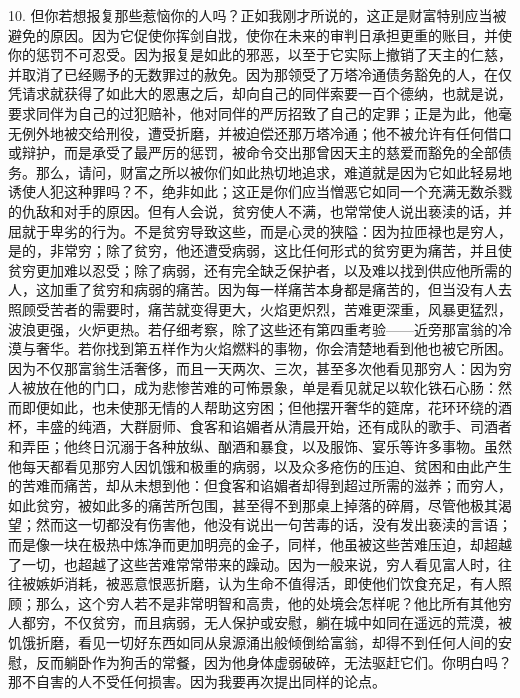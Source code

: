 10. 但你若想报复那些惹恼你的人吗？正如我刚才所说的，这正是财富特别应当被避免的原因。因为它促使你挥剑自戕，使你在未来的审判日承担更重的账目，并使你的惩罚不可忍受。因为报复是如此的邪恶，以至于它实际上撤销了天主的仁慈，并取消了已经赐予的无数罪过的赦免。因为那领受了万塔冷通债务豁免的人，在仅凭请求就获得了如此大的恩惠之后，却向自己的同伴索要一百个德纳，也就是说，要求同伴为自己的过犯赔补，他对同伴的严厉招致了自己的定罪；正是为此，他毫无例外地被交给刑役，遭受折磨，并被迫偿还那万塔冷通；他不被允许有任何借口或辩护，而是承受了最严厉的惩罚，被命令交出那曾因天主的慈爱而豁免的全部债务。那么，请问，财富之所以被你们如此热切地追求，难道就是因为它如此轻易地诱使人犯这种罪吗？不，绝非如此；这正是你们应当憎恶它如同一个充满无数杀戮的仇敌和对手的原因。但有人会说，贫穷使人不满，也常常使人说出亵渎的话，并屈就于卑劣的行为。不是贫穷导致这些，而是心灵的狭隘：因为拉匝禄也是穷人，是的，非常穷；除了贫穷，他还遭受病弱，这比任何形式的贫穷更为痛苦，并且使贫穷更加难以忍受；除了病弱，还有完全缺乏保护者，以及难以找到供应他所需的人，这加重了贫穷和病弱的痛苦。因为每一样痛苦本身都是痛苦的，但当没有人去照顾受苦者的需要时，痛苦就变得更大，火焰更炽烈，苦难更深重，风暴更猛烈，波浪更强，火炉更热。若仔细考察，除了这些还有第四重考验——近旁那富翁的冷漠与奢华。若你找到第五样作为火焰燃料的事物，你会清楚地看到他也被它所困。因为不仅那富翁生活奢侈，而且一天两次、三次，甚至多次他看见那穷人：因为穷人被放在他的门口，成为悲惨苦难的可怖景象，单是看见就足以软化铁石心肠：然而即便如此，也未使那无情的人帮助这穷困；但他摆开奢华的筵席，花环环绕的酒杯，丰盛的纯酒，大群厨师、食客和谄媚者从清晨开始，还有成队的歌手、司酒者和弄臣；他终日沉溺于各种放纵、酗酒和暴食，以及服饰、宴乐等许多事物。虽然他每天都看见那穷人因饥饿和极重的病弱，以及众多疮伤的压迫、贫困和由此产生的苦难而痛苦，却从未想到他：但食客和谄媚者却得到超过所需的滋养；而穷人，如此贫穷，被如此多的痛苦所包围，甚至得不到那桌上掉落的碎屑，尽管他极其渴望；然而这一切都没有伤害他，他没有说出一句苦毒的话，没有发出亵渎的言语；而是像一块在极热中炼净而更加明亮的金子，同样，他虽被这些苦难压迫，却超越了一切，也超越了这些苦难常常带来的躁动。因为一般来说，穷人看见富人时，往往被嫉妒消耗，被恶意恨恶折磨，认为生命不值得活，即使他们饮食充足，有人照顾；那么，这个穷人若不是非常明智和高贵，他的处境会怎样呢？他比所有其他穷人都穷，不仅贫穷，而且病弱，无人保护或安慰，躺在城中如同在遥远的荒漠，被饥饿折磨，看见一切好东西如同从泉源涌出般倾倒给富翁，却得不到任何人间的安慰，反而躺卧作为狗舌的常餐，因为他身体虚弱破碎，无法驱赶它们。你明白吗？那不自害的人不受任何损害。因为我要再次提出同样的论点。\newline{}\par

